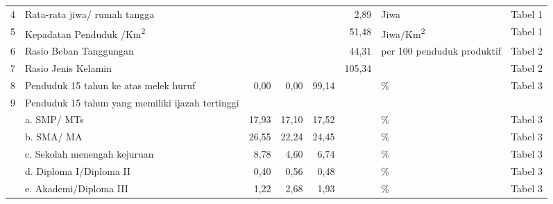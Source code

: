 \begin{small}
\begin{longtable}{rY{12em}rrrrY{5em}Y{5em}}
	  4 & Rata-rata jiwa/ rumah tangga                                                          &        &        &         &              2,89 & Jiwa                           & Tabel 1  \\
	                    5 & Kepadatan Penduduk /Km\textsuperscript{2}                                             &        &        &         &             51,48 & Jiwa/Km\textsuperscript{2}     & Tabel 1  \\
	  6 & Rasio Beban Tanggungan                                                                &        &        &         &             44,31 & per 100 penduduk produktif     & Tabel 2  \\
	                    7 & Rasio Jenis Kelamin                                                                   &        &        &         &            105,34 &                                & Tabel 2  \\
	  8 & Penduduk 15 tahun ke atas melek huruf                                                 &   0,00 &   0,00 &   99,14 &                   & \%                             & Tabel 3  \\
	                    9 & Penduduk 15 tahun yang memiliki ijazah tertinggi                                      &        &        &         &                   &                                &          \\
	                      & a. SMP/ MTs                                                                           &  17,93 &  17,10 &   17,52 &                   & \%                             & Tabel 3  \\
	                      & b. SMA/ MA                                                                            &  26,55 &  22,24 &   24,45 &                   & \%                             & Tabel 3  \\
	                      & c. Sekolah menengah kejuruan                                                          &   8,78 &   4,60 &    6,74 &                   & \%                             & Tabel 3  \\
	                      & d. Diploma I/Diploma II                                                               &   0,40 &   0,56 &    0,48 &                   & \%                             & Tabel 3  \\
	                      & e. Akademi/Diploma III                                                                &   1,22 &   2,68 &    1,93 &                   & \%                             & Tabel 3  \\

\end{longtable}
\end{small}
